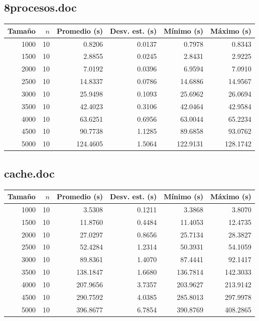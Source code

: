 \documentclass[conference]{IEEEtran}
\begin{document}
\subsection{8procesos.doc}
\begin{center}
\begin{tabular}{rrrrrr}
\toprule
Tamaño & $n$ & Promedio (s) & Desv. est. (s) & Mínimo (s) & Máximo (s) \\
\midrule
1000 & 10 & 0.8206 & 0.0137 & 0.7978 & 0.8343 \\
1500 & 10 & 2.8855 & 0.0245 & 2.8431 & 2.9225 \\
2000 & 10 & 7.0192 & 0.0396 & 6.9594 & 7.0910 \\
2500 & 10 & 14.8337 & 0.0786 & 14.6886 & 14.9567 \\
3000 & 10 & 25.9498 & 0.1093 & 25.6962 & 26.0694 \\
3500 & 10 & 42.4023 & 0.3106 & 42.0464 & 42.9584 \\
4000 & 10 & 63.6251 & 0.6956 & 63.0044 & 65.2234 \\
4500 & 10 & 90.7738 & 1.1285 & 89.6858 & 93.0762 \\
5000 & 10 & 124.4605 & 1.5064 & 122.9131 & 128.1742 \\
\bottomrule
\end{tabular}
\end{center}
\subsection{cache.doc}
\begin{center}
\begin{tabular}{rrrrrr}
\toprule
Tamaño & $n$ & Promedio (s) & Desv. est. (s) & Mínimo (s) & Máximo (s) \\
\midrule
1000 & 10 & 3.5308 & 0.1211 & 3.3868 & 3.8070 \\
1500 & 10 & 11.8760 & 0.4484 & 11.4053 & 12.4735 \\
2000 & 10 & 27.0297 & 0.8656 & 25.7134 & 28.3827 \\
2500 & 10 & 52.4284 & 1.2314 & 50.3931 & 54.1059 \\
3000 & 10 & 89.8361 & 1.4070 & 87.4441 & 92.1417 \\
3500 & 10 & 138.1847 & 1.6680 & 136.7814 & 142.3033 \\
4000 & 10 & 207.9656 & 3.7357 & 203.9627 & 213.9142 \\
4500 & 10 & 290.7592 & 4.0385 & 285.8013 & 297.9978 \\
5000 & 10 & 396.8677 & 6.7854 & 390.8769 & 408.2865 \\
\bottomrule
\end{tabular}
\end{center}
\end{document}

